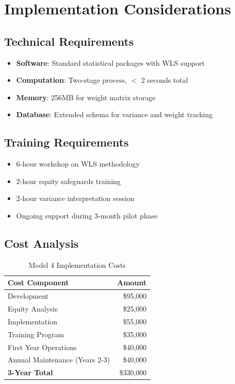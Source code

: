 \section{Implementation Considerations}

\subsection{Technical Requirements}

\begin{itemize}
    \item \textbf{Software}: Standard statistical packages with WLS support
    \item \textbf{Computation}: Two-stage process, $<$ 2 seconds total
    \item \textbf{Memory}: 256MB for weight matrix storage
    \item \textbf{Database}: Extended schema for variance and weight tracking
\end{itemize}

\subsection{Training Requirements}

\begin{itemize}
    \item 6-hour workshop on WLS methodology
    \item 2-hour equity safeguards training
    \item 2-hour variance interpretation session
    \item Ongoing support during 3-month pilot phase
\end{itemize}

\subsection{Cost Analysis}

\begin{table}[h]
\centering
\caption{Model 4 Implementation Costs}
\begin{tabular}{lr}
\toprule
\textbf{Cost Component} & \textbf{Amount} \\
\midrule
Development & \$95,000 \\
Equity Analysis & \$25,000 \\
Implementation & \$55,000 \\
Training Program & \$35,000 \\
First Year Operations & \$40,000 \\
Annual Maintenance (Years 2-3) & \$40,000 \\
\midrule
\textbf{3-Year Total} & \$330,000 \\
\bottomrule
\end{tabular}
\end{table}


